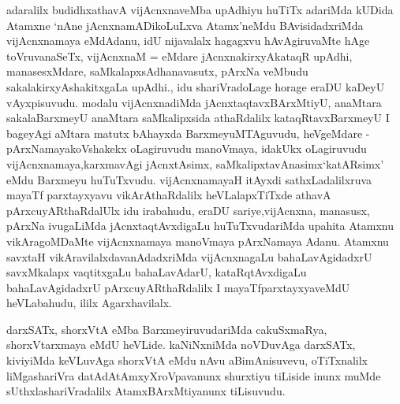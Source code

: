 \begin{artha}
adaralilx budidhxathavA vijAcnxnaveMba upAdhiyu huTiTx adariMda kUDida Atamxne `nAne jAcnxnamADikoLuLxva Atamx'neMdu BAvisidadxriMda vijAcnxnamaya eMdAdanu, idU nijavalalx hagagxvu hAvAgiruvaMte hAge toVruvanaSeTx, vijAcnxnaM = eMdare jAcnxnakirxyAkataqR upAdhi, manasesxMdare, saMkalapxsAdhanavasutx, pArxNa veMbudu sakalakirxyAshakitxgaLa upAdhi., idu shariVradoLage horage eraDU kaDeyU vAyxpisuvudu. modalu vijAcnxnadiMda jAcnxtaqtavxBArxMtiyU, anaMtara sakalaBarxmeyU anaMtara saMkalipxsida athaRdalilx kataqRtavxBarxmeyU I bageyAgi aMtara matutx bAhayxda BarxmeyuMTAguvudu, heVgeMdare - pArxNamayakoVshakekx oLagiruvudu manoVmaya, idakUkx oLagiruvudu vijAcnxnamaya,karxmavAgi jAcnxtAsimx, saMkalipxtavAnasimx\break `katARsimx' eMdu Barxmeyu huTuTxvudu. vijAcnxnamayaH itAyxdi sathxLadalilxruva mayaTf parxtayxyavu vikArAthaRdalilx heVLalapxTiTxde athavA pArxcuyARthaRdalUlx idu irabahudu, eraDU sariye,vijAcnxna, manasusx, pArxNa ivugaLiMda jAcnxtaqtAvxdigaLu huTuTxvudariMda upahita Atamxnu vikAragoMDaMte vijAcnxnamaya manoVmaya pArxNamaya Adanu. Atamxnu savxtaH vikAravilalxdavanAdadxriMda vijAcnxnagaLu bahaLavAgidadxrU savxMkalapx vaqtitxgaLu bahaLavAdarU, kataRqtAvxdigaLu bahaLavAgidadxrU pArxcuyARthaRdalilx I mayaTfparxtayxyaveMdU heVLabahudu, ililx Agarxhavilalx.

darxSATx, shorxVtA eMba BarxmeyiruvudariMda cakuSxmaRya, shorxVtarxmaya eMdU heVLide. kaNiNxniMda noVDuvAga darxSATx, kiviyiMda keVLuvAga shorxVtA eMdu nAvu aBimAnisuvevu, oTiTxnalilx liMgashariVra datAdAtAmxyXroVpavanunx shurxtiyu tiLiside inunx muMde sUthxlashariVradalilx AtamxBArxMtiyanunx tiLisuvudu.
\end{artha}

